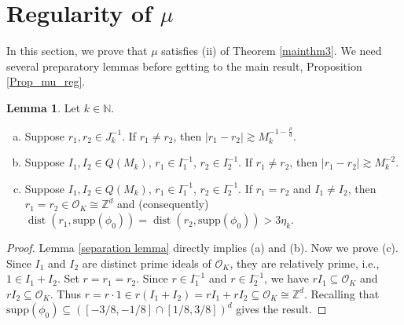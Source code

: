 \documentclass{amsart}
\numberwithin{equation}{section}
\theoremstyle{definition}
\newtheorem{lemma}[theorem]{Lemma}
\theoremstyle{definition}
\def\ZZ{\mathbb{Z}}
\def\NN{\mathbb{N}}
\def\supp{\mathrm{supp}}
\newcommand{\OK}{\mathcal{O}_K}
\newcommand{\isom}{\cong}
\DeclareMathOperator{\dist}{dist}
\begin{document}
\section{Regularity of \texorpdfstring{$\mu$}{mu}}\label{regularity_section}




In this section, we prove that $\mu$ satisfies (ii) of Theorem \ref{mainthm3}. We need several preparatory lemmas before getting to the main result, Proposition \ref{Prop_mu_reg}. 

\begin{lemma}\label{separation facts}
    Let $k \in \NN$.
\begin{enumerate}[(a)]
    \item Suppose $r_1, r_2 \in J_k^{-1}$. If $r_1 \neq r_2$,  then $|r_1 - r_2| \gtrsim M_{k}^{-1-\frac{\rho}{d}}$. 
    \item 
    Suppose $I_1,I_2 \in Q(M_k)$, $r_1 \in I_1^{-1}$, $r_2 \in I_2^{-1}$. 
    If $r_1 \neq r_2$, then $|r_1 - r_2| \gtrsim M_{k}^{-2}$. 
     \item Suppose $I_1,I_2 \in Q(M_k)$, 
     $r_1 \in I_1^{-1}$, $r_2 \in I_2^{-1}$. 
     If $r_1 = r_2$ and $I_1 \neq I_2$, then 
     $r_1=r_2 \in \OK \isom \ZZ^d$ and (consequently) 
     $\dist(r_1,\supp(\phi_0))=
     \dist(r_2,\supp(\phi_0)) > 3\eta_k$. 
\end{enumerate}
\end{lemma}
\begin{proof}
Lemma \ref{separation lemma} directly implies (a) and (b). 
Now we prove (c). 
Since $I_1$ and $I_2$ are distinct prime ideals of $\OK$, they are relatively prime, i.e., $1 \in I_1+I_2$.
Set $r = r_1=r_2$. 
Since $r \in I_1^{-1}$ and $r \in I_2^{-1}$, we have $rI_1 \subseteq \OK$ and $rI_2 \subseteq \OK$. 
Thus 
$
r = r \cdot 1 \in r(I_1+I_2) = rI_1 + rI_2 \subseteq 
\OK \isom \ZZ^d. 
$
Recalling that $\supp(\phi_0) \subseteq ([-3/8,-1/8] \cap [1/8,3/8])^d$ gives the result. 
\end{proof}
\end{document}
